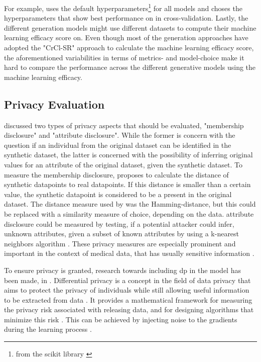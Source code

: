 For example, \cite{kunar2021DTGANDifferentialPrivatea} uses the default hyperparameters\footnote{from the scikit library \cite{scikit-learn}} for all models and 
\cite{kim2021OCTGANNeuralODEbased} choses the hyperparameters that show best performance on in cross-validation.
Lastly, the different generation models might use different datasets to compute their machine learning efficacy score on.
Even though most of the generation approaches have adopted the "CrCl-SR"\cite{goncalves2020GenerationEvaluationSynthetic} approach to calculate the machine learning efficacy score,
the aforementioned variabilities in terms of metrics- and model-choice make it hard to compare the performance across the different generative models using the machine learning efficacy.


\subsection{Privacy Evaluation}
\label{ch:preliminaries-evaluationOfSyntheticTabularData-privacyEvaluation}
\cite{goncalves2020GenerationEvaluationSynthetic} discussed two types of privacy aspects that should be evaluated, "membership disclosure" and "attribute disclosure".
While the former is concern with the question if an individual from the original dataset can be identified in the synthetic dataset, the latter is concerned with the possibility of inferring original values for an attribute of the original dataset, given the synthetic dataset.
To measure the membership disclosure, \cite{goncalves2020GenerationEvaluationSynthetic} proposes to calculate the distance of synthetic datapoints to real datapoints.
If this distance is smaller than a certain value, the synthetic datapoint is considered to be a present in the original dataset.
The distance measure used by \cite{goncalves2020GenerationEvaluationSynthetic} was the Hamming-distance, but this could be replaced with a similarity measure of choice, depending on the data.
attribute disclosure could be measured by testing, if a potential attacker could infer, unknown attributes, given a subset of known attributes by using a k-nearest neighbors algorithm \cite{goncalves2020GenerationEvaluationSynthetic}.
These privacy measures are especially prominent and important in the context of medical data, that has usually sensitive information \cite{goncalves2020GenerationEvaluationSynthetic, pmlr-v68-choi17a}.

To ensure privacy is granted, research towards including \gls{dp}\cite{dwork2008DifferentialPrivacySurvey} in the model has been made, \eg in \cite{xie2018DifferentiallyPrivateGenerative, jordon2018PATEGANGeneratingSynthetic, torfi2022DifferentiallyPrivateSynthetic}.
Differential privacy is a concept in the field of data privacy that aims to protect the privacy of individuals while still allowing useful information to be extracted from data \cite{dwork2008DifferentialPrivacySurvey}. 
It provides a mathematical framework for measuring the privacy risk associated with releasing data, and for designing algorithms that minimize this risk \cite{dwork2008DifferentialPrivacySurvey, zhao2022CTABGANEnhancingTabular}.
This can be achieved by injecting noise to the gradients during the learning process \cite{xie2018DifferentiallyPrivateGenerative}.

